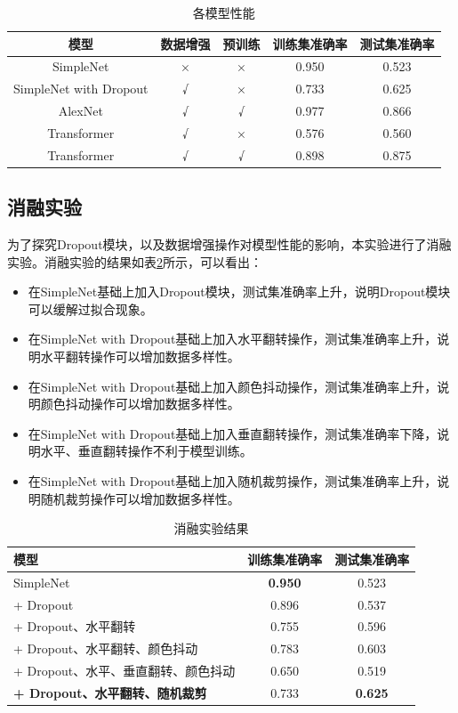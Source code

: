 \begin{table}[H]
    \centering
    \caption{各模型性能}
    \label{tab:performance}
    \begin{tabular}{c|c|c|c|c}
        \hline
        模型 & 数据增强 & 预训练 & 训练集准确率 & 测试集准确率 \\
        \hline
        SimpleNet & × & × & 0.950 & 0.523 \\
        SimpleNet with Dropout & √ & × & 0.733 & 0.625 \\
        AlexNet & √ & √ & 0.977 & 0.866 \\
        Transformer & √ & × & 0.576 & 0.560 \\
        Transformer & √ & √ & 0.898 & 0.875 \\
        \hline
    \end{tabular}
\end{table}

\subsection{消融实验}

为了探究Dropout模块，以及数据增强操作对模型性能的影响，本实验进行了消融实验。消融实验的结果如表\ref{tab:ablation}所示，可以看出：

\begin{itemize}
    \item 在SimpleNet基础上加入Dropout模块，测试集准确率上升，说明Dropout模块可以缓解过拟合现象。
    \item 在SimpleNet with Dropout基础上加入水平翻转操作，测试集准确率上升，说明水平翻转操作可以增加数据多样性。
    \item 在SimpleNet with Dropout基础上加入颜色抖动操作，测试集准确率上升，说明颜色抖动操作可以增加数据多样性。
    \item 在SimpleNet with Dropout基础上加入垂直翻转操作，测试集准确率下降，说明水平、垂直翻转操作不利于模型训练。
    \item 在SimpleNet with Dropout基础上加入随机裁剪操作，测试集准确率上升，说明随机裁剪操作可以增加数据多样性。
\end{itemize}

\begin{table}[H]
    \centering
    \caption{消融实验结果}
    \label{tab:ablation}
    \begin{tabular}{l|c|c}
        \hline
        模型 & 训练集准确率 & 测试集准确率 \\
        \hline
        SimpleNet & \textbf{0.950} & 0.523 \\
        + Dropout & 0.896 & 0.537 \\
        + Dropout、水平翻转 & 0.755 & 0.596 \\
        + Dropout、水平翻转、颜色抖动 & 0.783 & 0.603 \\
        + Dropout、水平、垂直翻转、颜色抖动 & 0.650 & 0.519 \\
        \textbf{+ Dropout、水平翻转、随机裁剪} & 0.733 & \textbf{0.625} \\
        \hline
    \end{tabular}
\end{table}

